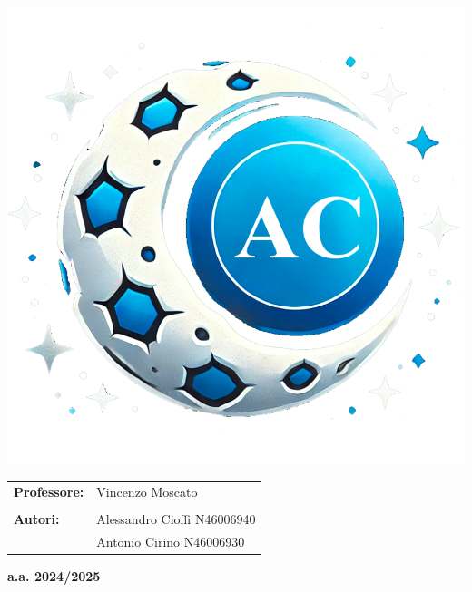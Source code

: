 \begin{titlepage}
\begin{center}
\begin{minipage}{0.4\textwidth}
            \includegraphics[width=\textwidth]{Media/logo_g.png}
        \end{minipage}
        
        \vspace{2cm}
    
        \Large
        \begin{tabular}{l l}
            \textbf{Professore:} & Vincenzo Moscato \\\\
            \textbf{Autori:} & Alessandro Cioffi \hfill N46006940 \\
                             & Antonio Cirino \hfill N46006930 \\
        \end{tabular}
    
        \vfill
    
        \textbf{a.a. 2024/2025}
    \end{center}
\end{titlepage}
